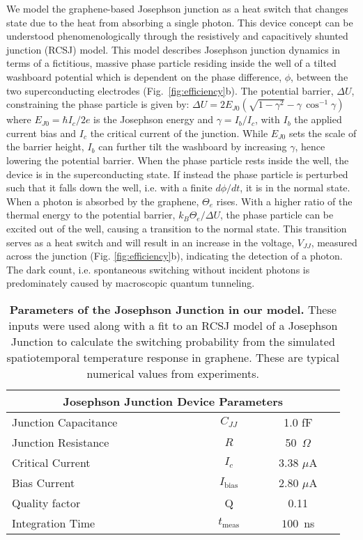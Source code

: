 \documentclass[aip, amsmath,amssymb, reprint]{revtex4-1}
\begin{document}
We model the graphene-based Josephson junction as a heat switch that changes state due to the heat from absorbing a single photon. This device concept\cite{Walsh.2017} can be understood phenomenologically through the resistively and capacitively shunted junction (RCSJ) model. This model describes Josephson junction dynamics in terms of a fictitious, massive phase particle residing inside the well of a tilted washboard potential which is dependent on the phase difference, $\phi$, between the two superconducting electrodes (Fig.\ \ref{fig:efficiency}b). The potential barrier, $\Delta U$, constraining the phase particle is given by: $\Delta U = 2 E_{J0}(\sqrt{1 - \gamma^2}-\gamma \, \cos^{-1}\gamma)$ where $E_{J0} = \hbar I_{c}/2e$ is the Josephson energy and $\gamma = I_b/I_c$, with $I_b$ the applied current bias and $I_c$ the critical current of the junction. While $E_{J0}$ sets the scale of the barrier height, $I_b$ can further tilt the washboard by increasing $\gamma$, hence lowering the potential barrier. When the phase particle rests inside the well, the device is in the superconducting state. If instead the phase particle is perturbed such that it falls down the well, i.e. with a finite $d\phi/dt$, it is in the normal state. When a photon is absorbed by the graphene, $\Theta_{e}$ rises. With a higher ratio of the thermal energy to the potential barrier, $k_B\Theta_{e}/\Delta U$, the phase particle can be excited out of the well, causing a transition to the normal state. This transition serves as a heat switch and will result in an increase in the voltage, $V_{JJ}$, measured across the junction (Fig. \ref{fig:efficiency}b), indicating the detection of a photon. The dark count, i.e. spontaneous switching without incident photons is predominately caused by macroscopic quantum tunneling\cite{Walsh.2017,Walsh.2021}.

\begin{table}
\centering
\begin{tabular}{ l c c } 
\hline\hline
\multicolumn{3}{c}{~~~~~~~~Josephson Junction Device Parameters~~~~~~~~}\\
\hline
Junction Capacitance & $C_{JJ}$ & 1.0 fF\\
Junction Resistance & $R$ & 50~$\Omega$\\
Critical Current & $I_{c}$ & 3.38 $\mu$A\\
Bias Current & $I_{\text{bias}}$ & 2.80 $\mu$A\\
Quality factor & Q & 0.11\\
Integration Time & $t_{\text{meas}}$ & $100$~ns\\
\hline
\end{tabular}
\caption{\textbf{Parameters of the Josephson Junction in our model.} These inputs were used along with a fit to an RCSJ model of a Josephson Junction to calculate the switching probability from the simulated spatiotemporal temperature response in graphene. These are typical numerical values from experiments\cite{Walsh.2017, Walsh.2021}.}
\label{tab:RCSJparameters}
\end{table}
\end{document}
